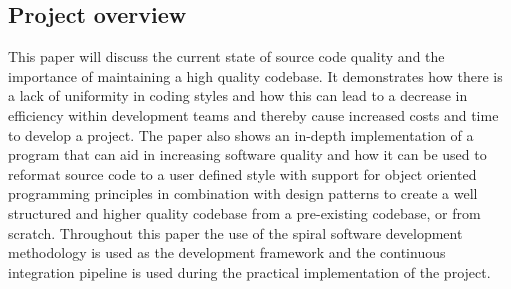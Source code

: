 \subsection{Project overview}
This paper will discuss the current state of source code quality and the importance of maintaining a high quality codebase. It demonstrates how there is a lack of uniformity in coding styles and how this can lead to a decrease in efficiency within development teams and thereby cause increased costs and time to develop a project.
The paper also shows an in-depth implementation of a program that can aid in increasing software quality and how it can be used to reformat source code to a user defined style with support for object oriented programming principles in combination with design patterns to create a well structured and higher quality codebase from a pre-existing codebase, or from scratch.
Throughout this paper the use of the spiral software development methodology is used as the development framework and the continuous integration pipeline is used during the practical implementation of the project.

